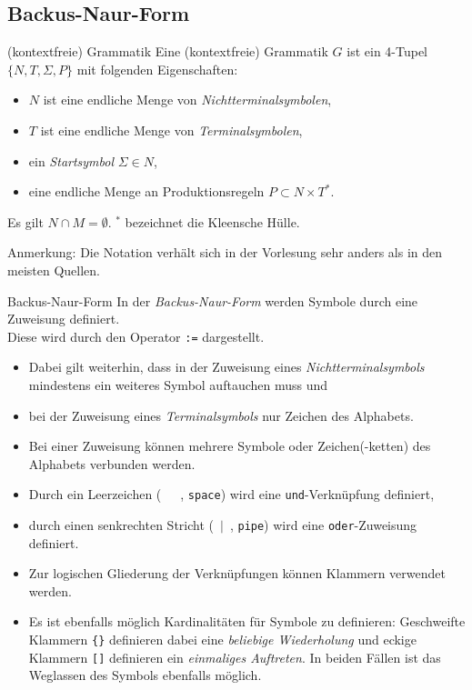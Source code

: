 \documentclass[german]{../spicker}
\begin{document}
\subsection{Backus-Naur-Form}

\begin{defi}{(kontextfreie) Grammatik}
    Eine (kontextfreie) Grammatik $G$ ist ein 4-Tupel $\{N, T, \Sigma, P\}$ mit folgenden Eigenschaften:
    \begin{itemize}
        \item $N$ ist eine endliche Menge von \emph{Nichtterminalsymbolen},
        \item $T$ ist eine endliche Menge von \emph{Terminalsymbolen},
        \item ein \emph{Startsymbol} $\Sigma \in N$,
        \item eine endliche Menge an Produktionsregeln $P \subset N \times T^*$.
    \end{itemize}
    Es gilt $N \cap M = \emptyset$. $^*$ bezeichnet die Kleensche Hülle.

    Anmerkung: Die Notation verhält sich in der Vorlesung sehr anders als in den meisten Quellen.
\end{defi}

\begin{defi}{Backus-Naur-Form}
    In der \emph{Backus-Naur-Form} werden Symbole durch eine Zuweisung definiert.\\
    Diese wird durch den Operator \texttt{:=} dargestellt.

    \begin{itemize}
        \item Dabei gilt weiterhin, dass in der Zuweisung eines \emph{Nichtterminalsymbols} mindestens ein weiteres Symbol auftauchen muss und
        \item bei der Zuweisung eines \emph{Terminalsymbols} nur Zeichen des Alphabets.
        \item Bei einer Zuweisung können mehrere Symbole oder Zeichen(-ketten) des Alphabets verbunden werden.
        \item Durch ein Leerzeichen (\glqq ~~~\grqq, \texttt{space}) wird eine \texttt{und}-Verknüpfung definiert,
        \item durch einen senkrechten Stricht (\glqq ~$\mid$~\grqq, \texttt{pipe}) wird eine \texttt{oder}-Zuweisung definiert.
        \item Zur logischen Gliederung der Verknüpfungen können Klammern verwendet werden.
        \item Es ist ebenfalls möglich Kardinalitäten für Symbole zu definieren:
              \subitem Geschweifte Klammern \texttt{\{\}} definieren dabei eine \emph{beliebige Wiederholung} und
              \subitem eckige Klammern \texttt{[]} definieren ein \emph{einmaliges Auftreten}.
              \subitem In beiden Fällen ist das Weglassen des Symbols ebenfalls möglich.
    \end{itemize}
\end{defi}
\end{document}
